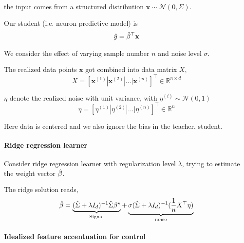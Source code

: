 the input comes from a structured distribution $\mathbf{x}\sim\mathcal{N}(0,\Sigma)$.

Our student (i.e. neuron predictive model) is
\[
\hat{y}={\hat{\beta}}^{\top}\mathbf{x}
\]

We consider the effect of varying sample number $n$ and noise level
$\sigma$.

The realized data points $\mathbf{x}$ got combined into data matrix
$X$,
\[
X=[\mathbf{x}^{(1)}|\mathbf{x}^{(2)}|...|\mathbf{x}^{(n)}]^{\top}\in\mathbb{R}^{n\times d}
\]

$\eta$ denote the realized noise with unit variance, with $\eta^{(i)}\sim\mathcal{N}(0,1)$
\[
\eta=[\eta^{(1)}|\eta^{(2)}|...|\eta^{(n)}]^{\top}\in\mathbb{R}^{n}
\]

Here data is centered and we also ignore the bias in the teacher,
student.

\paragraph{Ridge regression learner}

Consider ridge regression learner with regularization level $\lambda$,
trying to estimate the weight vector $\hat{\beta}$.

The ridge solution reads,
\[
\hat{\beta}=\underbrace{(\hat{\Sigma}+\lambda I_{d})^{-1}\hat{\Sigma}{\beta^{\star}}}_{\text{Signal}}+\underbrace{\sigma(\hat{\Sigma}+\lambda I_{d})^{-1}(\frac{1}{n}X^{\top}\eta)}_{\text{noise}}
\]

{\bfseries{}%
\noindent{}}

\paragraph{Idealized feature accentuation for control}

